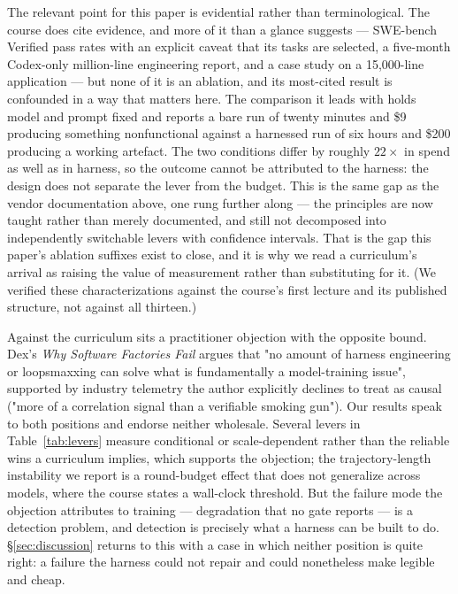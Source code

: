 \documentclass[smallcondensed,natbib]{svjour3}
\begin{document}
The relevant point for this paper is evidential rather than
terminological. The course does cite evidence, and more of it than a
glance suggests --- SWE-bench Verified pass rates with an explicit
caveat that its tasks are selected, a five-month Codex-only
million-line engineering report, and a case study on a 15{,}000-line
application --- but none of it is an ablation, and its most-cited
result is confounded in a way that matters here. The comparison it
leads with holds model and prompt fixed and reports a bare run of
twenty minutes and \$9 producing something nonfunctional against a
harnessed run of six hours and \$200 producing a working artefact. The
two conditions differ by roughly $22\times$ in spend as well as in
harness, so the outcome cannot be attributed to the harness: the design
does not separate the lever from the budget. This is the same gap as
the vendor documentation above, one rung further along --- the
principles are now taught rather than merely documented, and still not
decomposed into independently switchable levers with confidence
intervals. That is the gap this paper's ablation suffixes exist to
close, and it is why we read a curriculum's arrival as raising the
value of measurement rather than substituting for it. (We verified
these characterizations against the course's first lecture and its
published structure, not against all thirteen.)

Against the curriculum sits a practitioner objection with the opposite
bound. Dex's \emph{Why Software Factories Fail} \citep{dex2026wsff}
argues that "no amount of harness engineering or loopsmaxxing can solve
what is fundamentally a model-training issue", supported by industry
telemetry the author explicitly declines to treat as causal ("more of a
correlation signal than a verifiable smoking gun"). Our results speak
to both positions and endorse neither wholesale. Several levers in
Table~\ref{tab:levers} measure conditional or scale-dependent rather
than the reliable wins a curriculum implies, which supports the
objection; the trajectory-length instability we report is a
round-budget effect that does not generalize across models, where the
course states a wall-clock threshold. But the failure mode the
objection attributes to training --- degradation that no gate reports
--- is a detection problem, and detection is precisely what a harness
can be built to do. \S\ref{sec:discussion} returns to this with a case
in which neither position is quite right: a failure the harness could
not repair and could nonetheless make legible and cheap.
\end{document}
